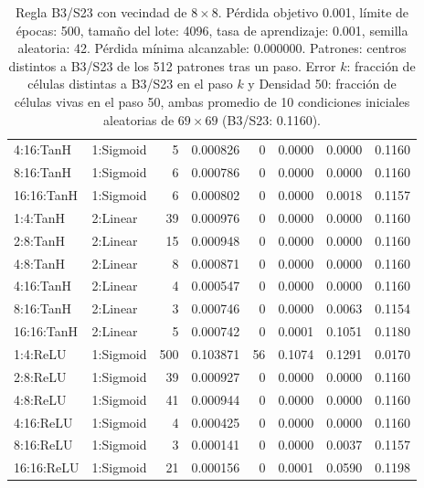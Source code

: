 \begin{table}[H]
\begin{tabular}{llrrrrrr}
		4:16:TanH & 1:Sigmoid & 5 & 0.000826 & 0 & 0.0000 & 0.0000 & 0.1160 \\
		8:16:TanH & 1:Sigmoid & 6 & 0.000786 & 0 & 0.0000 & 0.0000 & 0.1160 \\
		16:16:TanH & 1:Sigmoid & 6 & 0.000802 & 0 & 0.0000 & 0.0018 & 0.1157 \\
		\midrule
		1:4:TanH & 2:Linear & 39 & 0.000976 & 0 & 0.0000 & 0.0000 & 0.1160 \\
		2:8:TanH & 2:Linear & 15 & 0.000948 & 0 & 0.0000 & 0.0000 & 0.1160 \\
		4:8:TanH & 2:Linear & 8 & 0.000871 & 0 & 0.0000 & 0.0000 & 0.1160 \\
		4:16:TanH & 2:Linear & 4 & 0.000547 & 0 & 0.0000 & 0.0000 & 0.1160 \\
		8:16:TanH & 2:Linear & 3 & 0.000746 & 0 & 0.0000 & 0.0063 & 0.1154 \\
		16:16:TanH & 2:Linear & 5 & 0.000742 & 0 & 0.0001 & 0.1051 & 0.1180 \\
		\midrule
		1:4:ReLU & 1:Sigmoid & 500 & 0.103871 & 56 & 0.1074 & 0.1291 & 0.0170 \\
		2:8:ReLU & 1:Sigmoid & 39 & 0.000927 & 0 & 0.0000 & 0.0000 & 0.1160 \\
		4:8:ReLU & 1:Sigmoid & 41 & 0.000944 & 0 & 0.0000 & 0.0000 & 0.1160 \\
		4:16:ReLU & 1:Sigmoid & 4 & 0.000425 & 0 & 0.0000 & 0.0000 & 0.1160 \\
		8:16:ReLU & 1:Sigmoid & 3 & 0.000141 & 0 & 0.0000 & 0.0037 & 0.1157 \\
		16:16:ReLU & 1:Sigmoid & 21 & 0.000156 & 0 & 0.0001 & 0.0590 & 0.1198 \\
		\bottomrule
	\end{tabular}
	\caption{Regla B3/S23 con vecindad de $8\times8$. Pérdida objetivo 0.001, límite de épocas: 500, tamaño del lote: 4096, tasa de aprendizaje: 0.001, semilla aleatoria: 42. Pérdida mínima alcanzable: 0.000000. Patrones: centros distintos a B3/S23 de los 512 patrones tras un paso. Error $k$: fracción de células distintas a B3/S23 en el paso $k$ y Densidad 50: fracción de células vivas en el paso 50, ambas promedio de 10 condiciones iniciales aleatorias de $69\times69$ (B3/S23: 0.1160).}
	\label{tab:vecindad_8x8}
\end{table}

